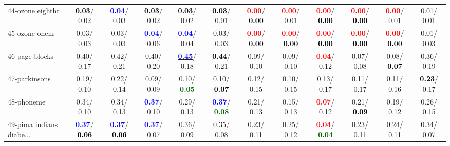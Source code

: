 \begin{table}[h]
\begin{center}
{\begin{tabular}{lc|c|c|c|c|c|c|c|c|c|c}
44-ozone eighthr & \textcolor{black}{\textbf{  0.03}}/  0.02 & \underline{\textcolor{blue}{\textbf{  0.04}}}/  0.03 & \textcolor{black}{\textbf{  0.03}}/  0.02 & \textcolor{black}{\textbf{  0.03}}/  0.02 & \textcolor{black}{\textbf{  0.03}}/  0.01 & \textcolor{red}{\textbf{  0.00}}/\textcolor{black}{\textbf{  0.00}} & \textcolor{red}{\textbf{  0.00}}/  0.01 & \textcolor{red}{\textbf{  0.00}}/\textcolor{black}{\textbf{  0.00}} & \textcolor{red}{\textbf{  0.00}}/\textcolor{black}{\textbf{  0.00}} & \textcolor{red}{\textbf{  0.00}}/  0.01 &   0.01/  0.01 \\
45-ozone onehr &   0.03/  0.03 &   0.03/  0.03 & \textcolor{blue}{\textbf{  0.04}}/  0.06 & \textcolor{blue}{\textbf{  0.04}}/  0.04 &   0.03/  0.03 & \textcolor{red}{\textbf{  0.00}}/\textcolor{black}{\textbf{  0.00}} & \textcolor{red}{\textbf{  0.00}}/\textcolor{black}{\textbf{  0.00}} & \textcolor{red}{\textbf{  0.00}}/\textcolor{black}{\textbf{  0.00}} & \textcolor{red}{\textbf{  0.00}}/\textcolor{black}{\textbf{  0.00}} & \textcolor{red}{\textbf{  0.00}}/\textcolor{black}{\textbf{  0.00}} &   0.01/  0.03 \\
46-page blocks &   0.40/  0.17 &   0.42/  0.21 &   0.40/  0.20 & \underline{\textcolor{blue}{\textbf{  0.45}}}/  0.18 & \textcolor{black}{\textbf{  0.44}}/  0.21 &   0.09/  0.10 &   0.09/  0.10 & \textcolor{red}{\textbf{  0.04}}/  0.12 &   0.07/  0.08 &   0.08/\textcolor{black}{\textbf{  0.07}} &   0.36/  0.19 \\ \hline
47-parkinsons &   0.19/  0.10 &   0.22/  0.14 &   0.09/  0.09 &   0.10/\textcolor{darkgreen}{\textbf{  0.05}} &   0.10/\textcolor{black}{\textbf{  0.07}} &   0.12/  0.15 &   0.10/  0.15 &   0.13/  0.17 &   0.11/  0.17 &   0.11/  0.16 & \textcolor{black}{\textbf{  0.23}}/  0.17 \\
48-phoneme &   0.34/  0.10 &   0.34/  0.13 & \textcolor{blue}{\textbf{  0.37}}/  0.10 &   0.29/  0.13 & \textcolor{blue}{\textbf{  0.37}}/\textcolor{darkgreen}{\textbf{  0.08}} &   0.21/  0.13 &   0.15/  0.13 & \textcolor{red}{\textbf{  0.07}}/  0.12 &   0.21/\textcolor{black}{\textbf{  0.09}} &   0.19/  0.12 &   0.26/  0.15 \\
49-pima indians diabe... & \textcolor{blue}{\textbf{  0.37}}/\textcolor{black}{\textbf{  0.06}} & \textcolor{blue}{\textbf{  0.37}}/\textcolor{black}{\textbf{  0.06}} & \textcolor{blue}{\textbf{  0.37}}/  0.07 &   0.36/  0.09 &   0.35/  0.08 &   0.23/  0.11 &   0.25/  0.12 & \textcolor{red}{\textbf{  0.04}}/\textcolor{darkgreen}{\textbf{  0.04}} &   0.23/  0.11 &   0.24/  0.11 &   0.34/  0.07 \\

\end{tabular}}
\end{center}
\end{table}
